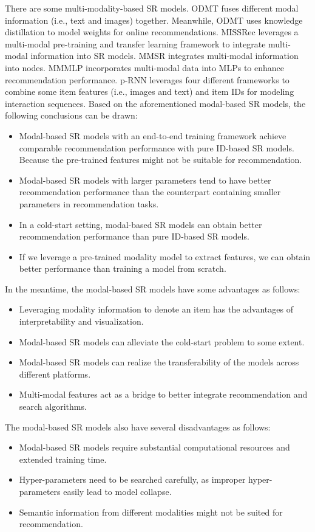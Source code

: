 \documentclass[review]{fcs}
\begin{document}
	There are some multi-modality-based SR models. ODMT \cite{ODMT} fuses different modal information (i.e., text and images) together. Meanwhile, ODMT uses knowledge distillation to model weights for online recommendations. MISSRec\cite{MISSRec} leverages a multi-modal pre-training and transfer learning framework to integrate multi-modal information into SR models. MMSR \cite{MMSR} integrates multi-modal information into nodes. MMMLP \cite{MMMLP}  incorporates multi-modal data into MLPs to enhance recommendation performance. p-RNN \cite{p-RNN} leverages four different frameworks to combine some item features (i.e., images and text) and item IDs for modeling interaction sequences. Based on the aforementioned modal-based SR models, the following conclusions can be drawn:
	\begin{itemize}
		\item Modal-based SR models with an end-to-end training framework achieve comparable recommendation performance with pure ID-based SR models. Because the pre-trained features might not be suitable for recommendation.
		\item Modal-based SR models with larger parameters tend to have better recommendation performance than the counterpart containing smaller parameters in recommendation tasks.
		\item In a cold-start setting, modal-based SR models can obtain better recommendation performance than pure ID-based SR models.
		\item If we leverage a pre-trained modality model to extract features, we can obtain better performance than training a model from scratch.
	\end{itemize}
	In the meantime, the modal-based SR models have some advantages as follows:
	\begin{itemize}
		\item Leveraging modality information to denote an item has the advantages of interpretability and visualization.
		\item Modal-based SR models can alleviate the cold-start problem to some extent.
		\item Modal-based SR models can realize the transferability of the models across different platforms.
		\item Multi-modal features act as a bridge to better integrate recommendation and search algorithms.
	\end{itemize}
	The modal-based SR models also have several disadvantages as follows:
	\begin{itemize}
		\item Modal-based SR models require substantial computational resources and extended training time.
		\item Hyper-parameters need to be searched carefully, as improper hyper-parameters easily lead to model collapse.
		\item Semantic information from different modalities might not be suited for recommendation.
	\end{itemize}
	
\end{document}
